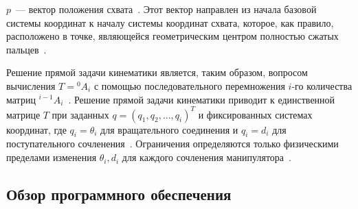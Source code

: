 \documentclass[oneside, final, 14pt]{extarticle}
\begin{document}
\par
\(p\)~--- вектор положения схвата~\cite{fu:rob_tech}. Этот вектор направлен из начала базовой системы координат к началу системы координат схвата, которое, как правило, расположено в точке, являющейся геометрическим центром полностью сжатых пальцев~\cite{fu:rob_tech}.
\par
Решение прямой задачи кинематики является, таким образом, вопросом вычисления \(T = {}^0A_i\) с помощью последовательного перемножения \(i\)-го количества матриц \({}^{i-1}A_i\)~\cite{fu:rob_tech}.
Решение прямой задачи кинематики приводит к единственной матрице \(T\) при заданных \(q = (q_1, q_2,\ldots, q_i)^T\) и фиксированных системах координат, где \(q_i = \theta_i\) для вращательного соединения и \(q_i = d_i\) для поступательного сочленения~\cite{fu:rob_tech}.
Ограничения определяются только физическими пределами изменения \(\theta_i, d_i\) для каждого сочленения манипулятора~\cite{fu:rob_tech}.

\subsection{Обзор программного обеспечения}
\end{document}
